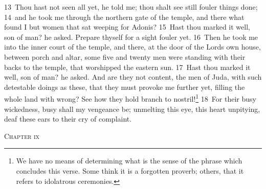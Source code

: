 \documentclass[10pt]{book} %
\begin{document}
\textcolor{benred8}{13}~Thou hast not seen all yet, he told me; thou shalt see still fouler things done; \textcolor{benred8}{14}~and he took me through the northern gate of the temple, and there what found I but women that sat weeping for Adonis? \textcolor{benred8}{15}~Hast thou marked it well, son of man? he asked. Prepare thyself for a sight fouler yet. \textcolor{benred8}{16}~Then he took me into the inner court of the temple, and there, at the door of the Lord\textquotesingle s own house, between porch and altar, some five and twenty men were standing with their backs to the temple, that worshipped the eastern sun. \textcolor{benred8}{17}~Hast thou marked it well, son of man? he asked. And are they not content, the men of Juda, with such detestable doings as these, that they must provoke me further yet, filling the whole land with wrong? See how they hold branch to nostril!\footnote[2]{We have no means of determining what is the sense of the phrase which concludes this verse. Some think it is a forgotten proverb; others, that it refers to idolatrous ceremonies.} \textcolor{benred8}{18}~For their busy wickedness, busy shall my vengeance be; unmelting this eye, this heart unpitying, deaf these ears to their cry of complaint.
\begin{large}\begin{center}\textsc{Chapter ix}\end{center}\end{large}
\end{document}
